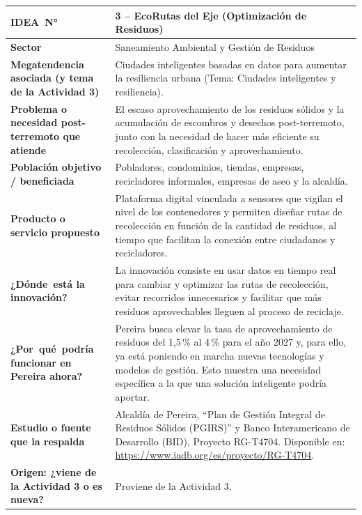 \documentclass[11pt,a4paper]{article}
\newcommand{\fichaactividad}[9]{%
    \def\fIdea{#1}%
    \def\fSector{#2}%
    \def\fMega{#3}%
    \def\fProb{#4}%
    \def\fPobl{#5}%
    \def\fProd{#6}%
    \def\fInno{#7}%
    \def\fPere{#8}%
    \def\fFuen{#9}%
    \fichaactividadb%
}
\newcommand{\fichaactividadb}[1]{%
\begin{table}[H]
\centering
\sffamily
\renewcommand{\arraystretch}{1.52}
\setlength{\tabcolsep}{9pt}
\small
\begin{tabularx}{\textwidth}{|>{\centering\arraybackslash\bfseries\color{white}\columncolor{coloractualficha}\hsize=0.32\hsize}X|>{\arraybackslash\hsize=0.68\hsize}X|}
\hline
\mbox{IDEA N°} & \cellcolor{bgactualficha}\textbf{\color{coloractualficha}\fIdea} \\
\hline
Sector & \fSector \\
\hline
Megatendencia asociada (y tema de la Actividad 3) & \fMega \\
\hline
Problema o necesidad post-terremoto que atiende & \fProb \\
\hline
Población objetivo / beneficiada & \fPobl \\
\hline
Producto o servicio propuesto & \fProd \\
\hline
\mbox{¿Dónde está} la innovación? & \fInno \\
\hline
\mbox{¿Por qué podría} funcionar en Pereira ahora? & \fPere \\
\hline
Estudio o fuente que la respalda & \fFuen \\
\hline
Origen: ¿viene de la Actividad 3 o es nueva? & #1 \\
\hline
\end{tabularx}
\end{table}
}
\begin{document}
\fichaactividad
{3 -- EcoRutas del Eje (Optimización de Residuos)}
{Saneamiento Ambiental y Gestión de Residuos}
{Ciudades inteligentes basadas en datos para aumentar la resiliencia urbana (Tema: Ciudades inteligentes y resiliencia).}
{El escaso aprovechamiento de los residuos sólidos y la acumulación de escombros y desechos post-terremoto, junto con la necesidad de hacer más eficiente su recolección, clasificación y aprovechamiento.}
{Pobladores, condominios, tiendas, empresas, recicladores informales, empresas de aseo y la alcaldía.}
{Plataforma digital vinculada a sensores que vigilan el nivel de los contenedores y permiten diseñar rutas de recolección en función de la cantidad de residuos, al tiempo que facilitan la conexión entre ciudadanos y recicladores.}
{La innovación consiste en usar datos en tiempo real para cambiar y optimizar las rutas de recolección, evitar recorridos innecesarios y facilitar que más residuos aprovechables lleguen al proceso de reciclaje.}
{Pereira busca elevar la tasa de aprovechamiento de residuos del 1,5\,\% al 4\,\% para el año 2027 y, para ello, ya está poniendo en marcha nuevas tecnologías y modelos de gestión. Esto muestra una necesidad específica a la que una solución inteligente podría aportar.}
{Alcaldía de Pereira, ``Plan de Gestión Integral de Residuos Sólidos (PGIRS)'' y Banco Interamericano de Desarrollo (BID), Proyecto RG-T4704. Disponible en: \url{https://www.iadb.org/es/proyecto/RG-T4704}.}
{Proviene de la Actividad 3.}

\newpage
\end{document}
